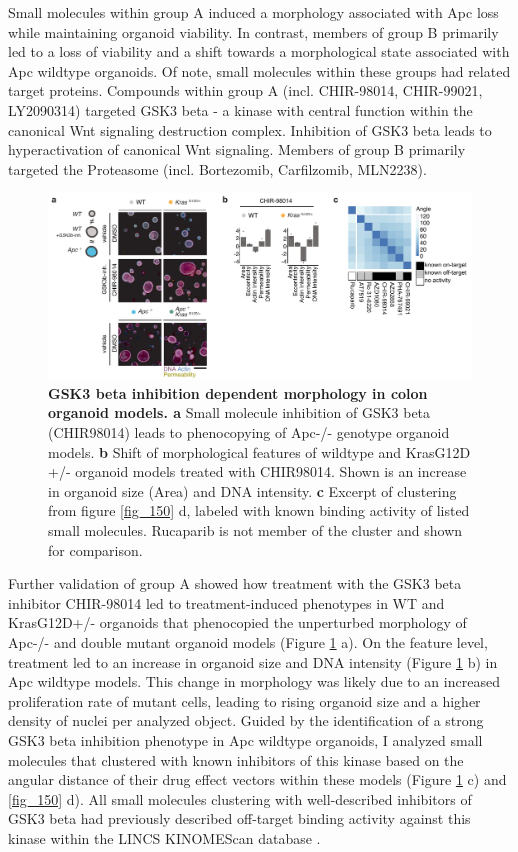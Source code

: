 \begin{flushleft}
Small molecules within group A induced a morphology associated with Apc loss while maintaining organoid viability. In contrast, members of group B primarily led to a loss of viability and a shift towards a morphological state associated with Apc wildtype organoids. Of note, small molecules within these groups had related target proteins. Compounds within group A (incl. CHIR-98014, CHIR-99021, LY2090314) targeted GSK3 beta - a kinase with central function within the canonical Wnt signaling destruction complex. Inhibition of GSK3 beta leads to hyperactivation of canonical Wnt signaling.
Members of group B primarily targeted the Proteasome (incl. Bortezomib, Carfilzomib, MLN2238).

\begin{figure}[h]
\centering
\includegraphics[scale=0.75,
                keepaspectratio]{figures/adenomaprofiling/pdf/fig_2_4.pdf}
\caption{\textbf{GSK3 beta inhibition dependent morphology in colon organoid models. a} Small molecule inhibition of GSK3 beta (CHIR98014) leads to phenocopying of Apc-/- genotype organoid models. \textbf{b} Shift of morphological features of wildtype and KrasG12D +/- organoid models treated with CHIR98014. Shown is an increase in organoid size (Area) and DNA intensity. \textbf{c} Excerpt of clustering from figure \ref{fig_150} d, labeled with known binding activity of listed small molecules. Rucaparib is not member of the cluster and shown for comparison.}
\label{fig_185}
\end{figure}
\bigbreak

Further validation of group A showed how treatment with the GSK3 beta inhibitor CHIR-98014 led to treatment-induced phenotypes in WT and KrasG12D+/- organoids that phenocopied the unperturbed morphology of Apc-/- and double mutant organoid models (Figure \ref{fig_185} a). On the feature level, treatment led to an increase in organoid size and DNA intensity (Figure \ref{fig_185} b) in Apc wildtype models. This change in morphology was likely due to an increased proliferation rate of mutant cells, leading to rising organoid size and a higher density of nuclei per analyzed object. Guided by the identification of a strong GSK3 beta inhibition phenotype in Apc wildtype organoids, I analyzed small molecules that clustered with known inhibitors of this kinase based on the angular distance of their drug effect vectors within these models (Figure \ref{fig_185} c) and \ref{fig_150} d). All small molecules clustering with well-described inhibitors of GSK3 beta had previously described off-target binding activity against this kinase within the LINCS KINOMEScan database \cite{Duan2014-ku}.  


\end{flushleft}
